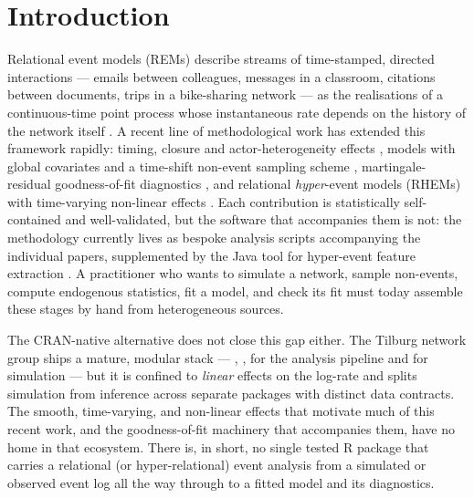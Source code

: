 \section{Introduction}
\label{sec:introduction}

Relational event models (REMs) describe streams of time-stamped, directed
interactions --- emails between colleagues, messages in a classroom, citations
between documents, trips in a bike-sharing network --- as the realisations of a
continuous-time point process whose instantaneous rate depends on the history of
the network itself \citep{butts2008, bianchi2024}. A recent line of methodological work has extended this framework rapidly: timing,
closure and actor-heterogeneity effects \citep{juozaitiene2024}, models with
global covariates and a time-shift non-event sampling scheme
\citep{lembo2025}, martingale-residual goodness-of-fit diagnostics
\citep{boschi2025gof}, and relational \emph{hyper}-event models (RHEMs) with
time-varying non-linear effects \citep{boschi2025rhem, lerner2023}. Each
contribution is statistically self-contained and well-validated, but the
software that accompanies them is not: the methodology currently lives as
bespoke analysis scripts accompanying the individual papers, supplemented by
the Java tool  for hyper-event feature extraction \citep{lerner2023}.
A practitioner who wants to simulate a network, sample non-events, compute
endogenous statistics, fit a model, and check its fit must today assemble these
stages by hand from heterogeneous sources.

The CRAN-native alternative does not close this gap either. The Tilburg
network group ships a mature, modular stack --- , ,
 for the analysis pipeline and  for simulation
\citep{lakdawala2025} --- but it is confined to \emph{linear} effects on the
log-rate and splits simulation from inference across separate packages with
distinct data contracts. The smooth, time-varying, and non-linear effects that
motivate much of this recent work, and the goodness-of-fit machinery
that accompanies them, have no home in that ecosystem. There is, in short, no
single tested R package that carries a relational (or hyper-relational) event
analysis from a simulated or observed event log all the way through to a fitted
model and its diagnostics.

